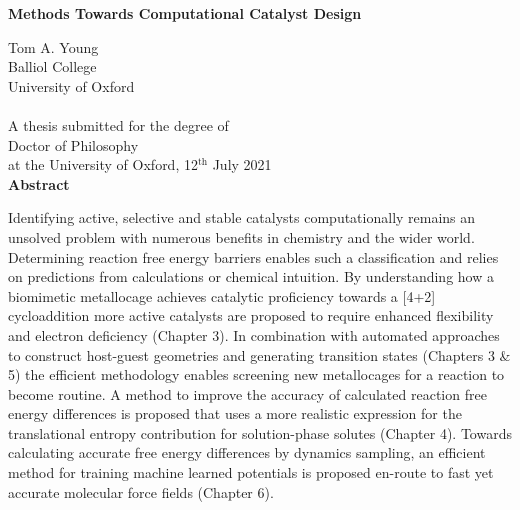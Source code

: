 \documentclass[main.tex]{subfiles}
\begin{document}
	\setcounter{page}{1}
	\begin{center}
		\begin{Large}
    		\null
			\vspace{-0.8cm}
			
			{\bfseries \Large \textsf{Methods Towards Computational Catalyst Design}}\\\vspace{0.3cm}
		\end{Large}
		\vspace{0.5cm}
		Tom A. Young\\
		Balliol College\\
		University of Oxford\\
		\ \\
		A thesis submitted for the degree of\\
		Doctor of Philosophy\\
		at the University of Oxford, 12${}^\text{th}$ July 2021\\
		\vspace{1cm}
		{\bfseries Abstract}
	\end{center}
    \null
    \vspace{-0.9cm}
	Identifying active, selective and stable catalysts computationally remains an unsolved problem with numerous benefits in chemistry and the wider world. Determining reaction free energy barriers enables such a classification and relies on predictions from calculations or chemical intuition. By understanding how a biomimetic metallocage achieves catalytic proficiency towards a [4+2] cycloaddition more active catalysts are proposed to require enhanced flexibility and electron deficiency (Chapter 3). In combination with automated approaches to construct host-guest geometries and generating transition states (Chapters 3 \& 5) the efficient methodology enables screening new metallocages for a reaction to become routine. A method to improve the accuracy of calculated reaction free energy differences is proposed that uses a more realistic expression for the translational entropy contribution for solution-phase solutes (Chapter 4). Towards calculating accurate free energy differences by dynamics sampling, an efficient method for training machine learned potentials is proposed en-route to fast yet accurate molecular force fields (Chapter 6).
	\
	
\end{document}
